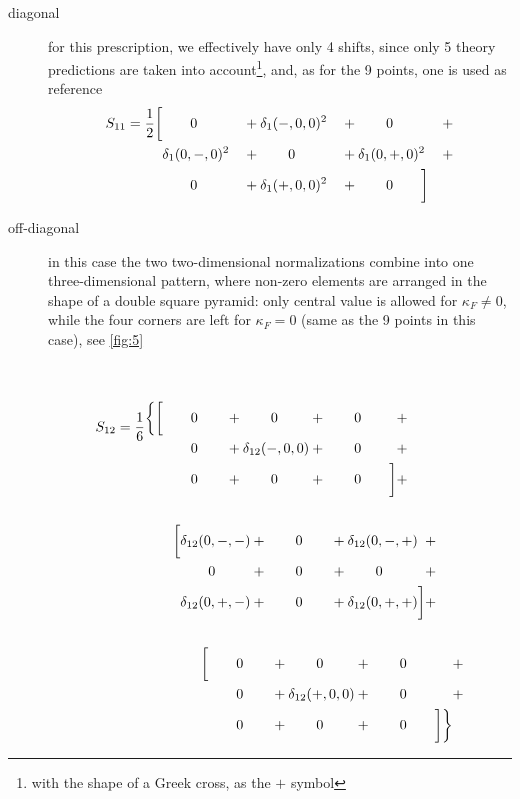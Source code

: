 \begin{description}
    \item[diagonal] for this prescription, we effectively have only 4 shifts,
        since only 5 theory predictions are taken into account\footnote{
            with the shape of a Greek cross, as the $+$ symbol
        }, and, as for the 9 points, one is used as reference
        \begin{alignat}{4}
            S_{11} = \frac{1}{2} \bigg[ \nonumber
                &\qquad 0 \qquad &&+ \delta_1(-,0,0)^2 &&+ \qquad 0 \qquad &&+\\
                &\delta_1(0,-,0)^2 &&+ \qquad 0 \qquad &&+ \delta_1(0,+,0)^2 &&+\\
                &\qquad 0 \qquad &&+ \delta_1(+,0,0)^2 &&+ \qquad 0 \qquad
            \bigg] \nonumber
        \end{alignat}
    \item[off-diagonal] in this case the two two-dimensional normalizations
        combine into one three-dimensional pattern, where non-zero elements are
        arranged in the shape of a double square pyramid: only central value is
        allowed for $\kappa_F \neq 0$, while the four corners are left for
        $\kappa_F = 0$ (same as the 9 points in this case), see \cref{fig:5}
        \vspace*{-30pt}
        \begin{align}
            S_{12} = \frac{1}{6} &
            \nonumber
            \begin{alignedat}{4}\\\\
                \bigg\{\bigg[
                    &\qquad 0 \qquad &&+ \qquad 0 \qquad &&+ \qquad 0 \qquad &&+\\
                    &\qquad 0 \qquad &&+ \delta_{12}(-,0,0) &&+ \qquad 0 \qquad &&+\\
                    &\qquad 0 \qquad &&+ \qquad 0 \qquad &&+ \qquad 0 \qquad 
                \bigg]&&+\\
            \end{alignedat}\\
            \nonumber\\
            &\qquad
            \begin{alignedat}{4}
                \bigg[
                    &\delta_{12}(0,-,-) &&+ \qquad 0 \qquad &&+ \delta_{12}(0,-,+) &&+ \\
                    &\qquad 0 \qquad &&+ \qquad 0 \qquad &&+ \qquad 0 \qquad &&+ \\
                    &\delta_{12}(0,+,-) &&+ \qquad 0 \qquad &&+ \delta_{12}(0,+,+) 
                \bigg]&&+\\
            \end{alignedat}\\
            \nonumber\\
            \nonumber&\qquad\qquad
            \begin{alignedat}{4}
                \bigg[
                    &\qquad 0 \qquad &&+ \qquad 0 \qquad &&+ \qquad 0 \qquad &&+\\
                    &\qquad 0 \qquad &&+ \delta_{12}(+,0,0) &&+ \qquad 0 \qquad &&+\\
                    &\qquad 0 \qquad &&+ \qquad 0 \qquad &&+ \qquad 0 \qquad 
                \bigg]\bigg\}
            \end{alignedat}
        \end{align}
\end{description}

